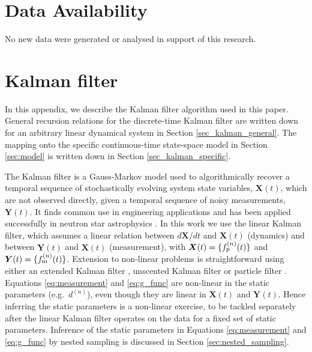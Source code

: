 \documentclass[fleqn,usenatbib,useAMS]{mnras}
\begin{document}
\section*{Data Availability}
No new data were generated or analysed in support of this research.





	


\appendix
\newpage
\newpage
\clearpage


\section{Kalman filter} \label{sec:kalman}
In this appendix, we describe the Kalman filter algorithm used in this paper. General recursion relations for the discrete-time Kalman filter are written down for an arbitrary linear dynamical system in Section \ref{sec_kalman_general}. The mapping onto the specific continuous-time state-space model in Section \ref{sec:model} is written down in Section \ref{sec_kalman_specific}.




The Kalman filter \citep{Kalman1} is a Gauss-Markov model used to algorithmically recover a temporal sequence of stochastically evolving  system state variables, $\boldsymbol{X}(t)$, which are not observed directly, given a temporal sequence of noisy measurements, $\boldsymbol{Y}(t)$. It finds common use in engineering applications and has been applied successfully in neutron star astrophysics \citep[e.g.][]{Myers2021MNRAS.502.3113M,Meyers2021,Melatos2023}. In this work we use the linear Kalman filter, which assumes a linear relation between $d{\boldsymbol{X}}/dt$ and ${\boldsymbol{X}}(t)$ (dynamics) and between ${\boldsymbol{Y}}(t)$ and ${\boldsymbol{X}}(t)$ (measurement), with ${\boldsymbol{X}}(t) = \{ f_{\rm p}^{(n)}(t) \}$ and ${\boldsymbol{Y}}(t) = \{ f_{\rm m}^{(n)}(t) \}$. Extension to non-linear problems is straightforward using either an extended Kalman filter \citep{zarchan2000fundamentals}, unscented Kalman filter \citep{882463van} or particle filter \citep{Simon10}. Equations \eqref{eq:measurement} and \eqref{eq:g_func} are non-linear in the static parameters (e.g.\ $d^{(n)}$), even though they are linear in ${\boldsymbol{X}}(t)$ and ${\boldsymbol{Y}}(t)$. Hence inferring the static parameters is a non-linear exercise, to be tackled separately after the linear Kalman filter operates on the data for a fixed set of static parameters. Inference of the static parameters in Equations \eqref{eq:measurement} and \eqref{eq:g_func} by nested sampling is discussed in Section \ref{sec:nested_sampling}. \newline 
\end{document}
